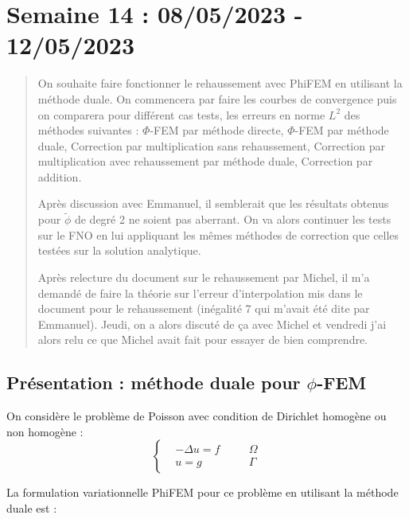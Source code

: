 \section{Semaine 14 : 08/05/2023 - 12/05/2023}
\graphicspath{{semaines/semaine_14/images/}}


\begin{abstract}
	On souhaite faire fonctionner le rehaussement avec PhiFEM en utilisant la méthode duale. On commencera par faire les courbes de convergence puis on comparera pour différent cas tests, les erreurs en norme $L^2$ des méthodes suivantes : $\Phi$-FEM par méthode directe, $\Phi$-FEM par méthode duale, Correction par multiplication sans rehaussement, Correction par multiplication avec rehaussement par méthode duale, Correction par addition.
	
	Après discussion avec Emmanuel, il semblerait que les résultats obtenus pour $\tilde{\phi}$ de degré 2 ne soient pas aberrant. On va alors continuer les tests sur le FNO en lui appliquant les mêmes méthodes de correction que celles testées sur la solution analytique.
	
	Après relecture du document sur le rehaussement par Michel, il m'a demandé de faire la théorie sur l'erreur d'interpolation mis dans le document pour le rehaussement (inégalité 7 qui m'avait été dite par Emmanuel). Jeudi, on a alors discuté de ça avec Michel et vendredi j'ai alors relu ce que Michel avait fait pour essayer de bien comprendre.
\end{abstract}

\subsection{Présentation : méthode duale pour $\phi$-FEM}

On considère le problème de Poisson avec condition de Dirichlet homogène ou non homogène :
\begin{equation*}
	\left\{\begin{aligned}
		&-\Delta u=f \quad &&\Omega \\
		&u=g \quad &&\Gamma
	\end{aligned}\right.
\end{equation*}

La formulation variationnelle PhiFEM pour ce problème en utilisant la méthode duale est :

